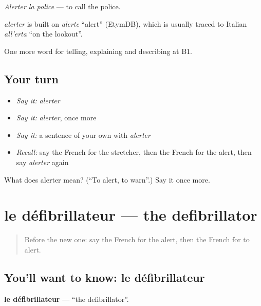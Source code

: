 \emph{Alerter la police} — to call the police.

\begin{cousinweb}
\emph{alerter} is built on \emph{alerte} \textquotedblleft{}alert\textquotedblright{} (EtymDB), which is usually traced to Italian \emph{all'erta} \textquotedblleft{}on the lookout\textquotedblright{}.
\end{cousinweb}

\begin{grammarlens}[title={What you've built}]
One more word for telling, explaining and describing at B1.
\end{grammarlens}

\subsection*{Your turn}
\begin{itemize}
\raggedright
  \item \emph{Say it:} \emph{alerter}
  \item \emph{Say it:} \emph{alerter}, once more
  \item \emph{Say it:} a sentence of your own with \emph{alerter}
  \item \emph{Recall:} say the French for the stretcher, then the French for the alert, then say \emph{alerter} again
\end{itemize}

\begin{tcolorbox}[breakable,colback=teal!4,colframe=teal!35!black,title={Before you move on}]
What does alerter mean? (\textquotedblleft{}To alert, to warn\textquotedblright{}.) Say it once more.
\end{tcolorbox}
\section[le défibrillateur]{le défibrillateur — the defibrillator}

\label{lesson:FR-C301-defibrillateur}



\begin{quote}
Before the new one: say the French for the alert, then the French for to alert.
\end{quote}

\subsection*{You'll want to know: le défibrillateur}
\textbf{le défibrillateur} — \textquotedblleft{}the defibrillator\textquotedblright{}.

